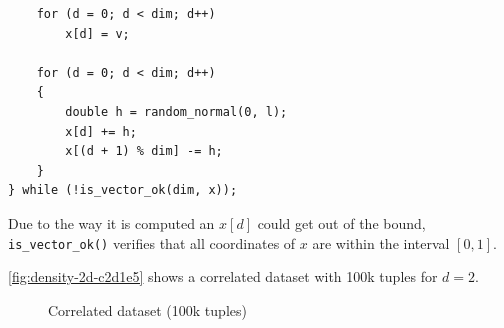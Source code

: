 \begin{itemize}
\begin{lstlisting}
	for (d = 0; d < dim; d++)
		x[d] = v;

	for (d = 0; d < dim; d++)
	{
		double h = random_normal(0, l);
		x[d] += h;
		x[(d + 1) % dim] -= h;
	}
} while (!is_vector_ok(dim, x));
\end{lstlisting}

Due to the way it is computed an $x[d]$ could get out of the bound,
\lstinline{is_vector_ok()} verifies that all coordinates of $x$ are
within the interval $[0,1]$.

\autoref{fig:density-2d-c2d1e5} shows a correlated dataset with
100k tuples for $d = 2$.

\begin{figure}[htbp]
\centering
{}%
%
\caption{Correlated dataset (100k tuples)}%
\label{fig:density-2d-c2d1e5}%
\end{figure}


\end{itemize}
